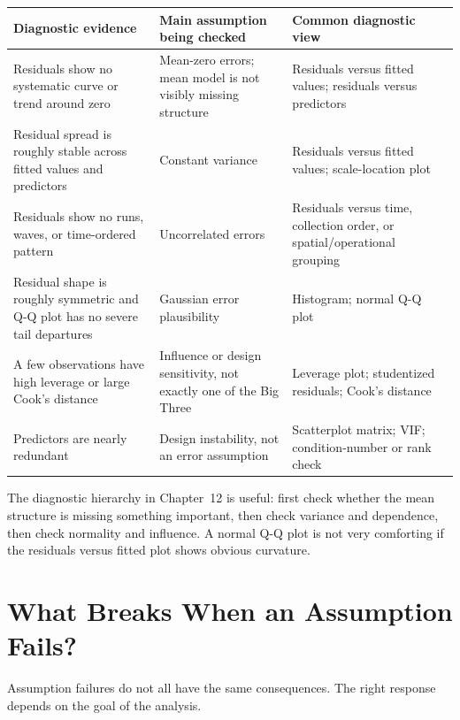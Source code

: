 \begin{center}
\begin{tabular}{>{\raggedright\arraybackslash}p{}>{\raggedright\arraybackslash}p{}>{\raggedright\arraybackslash}p{}}
\toprule
\textbf{Diagnostic evidence} & \textbf{Main assumption being checked} & \textbf{Common diagnostic view} \\
\midrule
Residuals show no systematic curve or trend around zero & Mean-zero errors; mean model is not visibly missing structure & Residuals versus fitted values; residuals versus predictors \\
Residual spread is roughly stable across fitted values and predictors & Constant variance & Residuals versus fitted values; scale-location plot \\
Residuals show no runs, waves, or time-ordered pattern & Uncorrelated errors & Residuals versus time, collection order, or spatial/operational grouping \\
Residual shape is roughly symmetric and Q-Q plot has no severe tail departures & Gaussian error plausibility & Histogram; normal Q-Q plot \\
A few observations have high leverage or large Cook's distance & Influence or design sensitivity, not exactly one of the Big Three & Leverage plot; studentized residuals; Cook's distance \\
Predictors are nearly redundant & Design instability, not an error assumption & Scatterplot matrix; VIF; condition-number or rank check \\
\bottomrule
\end{tabular}
\end{center}

The diagnostic hierarchy in Chapter~12 is useful: first check whether the mean structure is missing something important, then check variance and dependence, then check normality and influence.  A normal Q-Q plot is not very comforting if the residuals versus fitted plot shows obvious curvature.

\section{What Breaks When an Assumption Fails?}

Assumption failures do not all have the same consequences.  The right response depends on the goal of the analysis.

